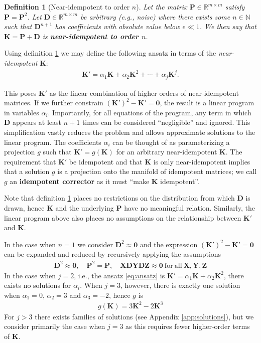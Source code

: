 \documentclass{article}
\newtheorem{definition}{Definition}
\newcommand{\vD}{\mathbf{D}}
\newcommand{\vK}{\mathbf{K}}
\newcommand{\vP}{\mathbf{P}}
\newcommand{\vX}{\mathbf{X}}
\newcommand{\vY}{\mathbf{Y}}
\newcommand{\vZ}{\mathbf{Z}}
\begin{document}
\begin{definition}[Near-idempotent to order $n$]
  Let the matrix $\vP \in \mathbb{R}^{m \times m}$ satisfy $\vP = \vP^2$. Let ${\vD \in \mathbb{R}^{m \times m}}$ be arbitrary (\textit{e.g.}, noise) where there exists some $n \in \mathbb{N}$ such that $\vD^{n+1}$ has coefficients with absolute value below $\epsilon \ll 1$. We then say that $\vK = \vP + \vD$ is \textbf{near-idempotent to order $n$}.
  \label{def:near-idem}
\end{definition}

Using definition \ref{def:near-idem} we may define the following ansatz in terms of the \textit{near-idempotent} $\vK$:
%
\begin{align}
  \vK' = \alpha_1 \vK + \alpha_2 \vK^2 + \cdots + \alpha_j \vK^j.
  \label{eq:ansatz}
\end{align}

This poses $\vK'$ as the linear combination of higher orders of near-idempotent matrices. If we further constrain $(\vK')^2 - \vK' = \bm{0}$, the result is a linear program in variables $\alpha_i$. Importantly, for all equations of the program, any term in which $\vD$ appears at least $n+1$ times can be considered ``negligible'' and ignored. This simplification vastly reduces the problem and allows approximate solutions to the linear program. The coefficients $\alpha_i$ can be thought of as parameterizing a projection $g$ such that $\vK' = g(\vK)$ for an arbitrary near-idempotent $\vK$. The requirement that $\vK'$ be idempotent and that $\vK$ is only near-idempotent implies that a solution $g$ is a projection onto the manifold of idempotent matrices; we call $g$ an \textbf{idempotent corrector} as it must ``make $\vK$ idempotent''.

Note that definition \ref{def:near-idem} places no restrictions on the distribution from which $\vD$ is drawn, hence $\vK$ and the underlying $\vP$ have no meaningful relation. Similarly, the linear program above also places no assumptions on the relationship between $\vK'$ and $\vK$.

In the case when $n=1$ we consider $\vD^2 \approx \bm{0}$ and the expression $(\vK')^2 - \vK' = \bm{0}$ can be expanded and reduced by recursively applying the assumptions
%
\begin{align*}
  \vD^2 \approx \bm{0}, \quad \vP^2 = \vP, \quad \vX \vD \vY \vD \vZ \approx \bm{0} \mathrm{~for~all~} \vX,\vY,\vZ
\end{align*}
%
In the case when $j=2$, i.e., the ansatz \ref{eq:ansatz} is $\vK' = \alpha_1 \vK + \alpha_2 \vK^2$, there exists no solutions for $\alpha_i$. When $j=3$, however, there is exactly one solution when $\alpha_1 = 0$, $\alpha_2 = 3$ and $\alpha_3 = -2$, hence $g$ is
%
\begin{align}
  g(\vK) = 3\vK^2 - 2 \vK^3
  \label{eq:}
\end{align}
%
For $j>3$ there exists families of solutions (see Appendix \ref{app:solutions}), but we consider primarily the case when $j=3$ as this requires fewer higher-order terms of $\vK$.
\end{document}

